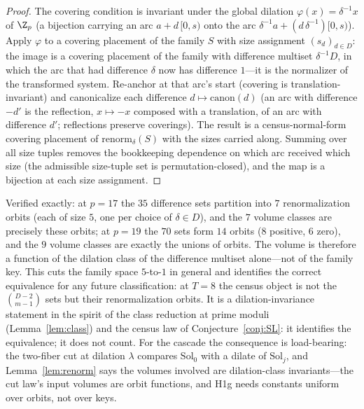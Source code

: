 \begin{proof}
The covering condition is invariant under the global dilation
$\varphi(x)=\delta^{-1}x$ of $\Z_p$ (a bijection carrying an arc
$a+d\,[0,s)$ onto the arc $\delta^{-1}a+(d\,\delta^{-1})[0,s)$). Apply
$\varphi$ to a covering placement of the family $S$ with size
assignment $(s_d)_{d\in D}$: the image is a covering placement of the
family with difference multiset $\delta^{-1}D$, in which the arc that
had difference $\delta$ now has difference $1$---it is the normalizer
of the transformed system. Re-anchor at that arc's start (covering is
translation-invariant) and canonicalize each difference
$d\mapsto\mathrm{canon}(d)$ (an arc with difference $-d'$ is the
reflection, $x\mapsto-x$ composed with a translation, of an arc with
difference $d'$; reflections preserve coverings). The result is a
census-normal-form covering placement of
$\mathrm{renorm}_\delta(S)$ with the sizes carried along. Summing over
all size tuples removes the bookkeeping dependence on which arc
received which size (the admissible size-tuple set is
permutation-closed), and the map is a bijection at each size
assignment.
\end{proof}

Verified exactly: at $p=17$ the $35$ difference sets partition into
$7$ renormalization orbits (each of size $5$, one per choice of
$\delta\in D$), and the $7$ volume classes are precisely these orbits;
at $p=19$ the $70$ sets form $14$ orbits ($8$ positive, $6$ zero), and
the $9$ volume classes are exactly the unions of orbits. The volume is
therefore a function of the dilation class of the difference multiset
alone---not of the family key. This cuts the family space $5$-to-$1$
in general and identifies the correct equivalence for any future
classification: at $T=8$ the census object is not the
$\binom{D-2}{m-1}$ sets but their renormalization orbits. It is a
dilation-invariance statement in the spirit of the class reduction at
prime moduli (Lemma~\ref{lem:class}) and the census law of
Conjecture~\ref{conj:SL}: it identifies the equivalence; it does not
count. For the cascade the consequence is load-bearing: the two-fiber
cut at dilation $\lambda$ compares $\mathrm{Sol}_0$ with a dilate of
$\mathrm{Sol}_j$, and Lemma~\ref{lem:renorm} says the volumes involved
are dilation-class invariants---the cut law's input volumes are orbit
functions, and H1g needs constants uniform over orbits, not over keys.

